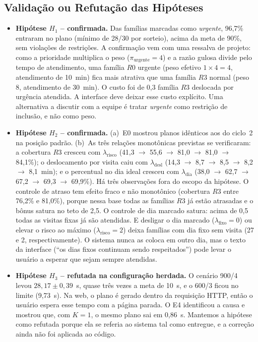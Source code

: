 \documentclass[11pt,a4paper]{article}
\begin{document}
\subsection{Validação ou Refutação das Hipóteses}
\begin{itemize}
    \item \textbf{Hipótese $H_1$ -- confirmada.} Das famílias marcadas como \emph{urgente}, 96,7\% entraram no plano (mínimo de 28/30 por sorteio), acima da meta de 90\%, sem violações de restrições. A confirmação vem com uma ressalva de projeto: como a prioridade multiplica o peso ($\pi_{\text{urgente}}=4$) e a razão gulosa divide pelo tempo de atendimento, uma família $R0$ urgente (peso efetivo $1 \times 4 = 4$, atendimento de 10~min) fica mais atrativa que uma família $R3$ normal (peso 8, atendimento de 30~min). O custo foi de 0,3 família $R3$ deslocada por urgência atendida. A interface deve deixar esse custo explícito. Uma alternativa a discutir com a equipe é tratar \emph{urgente} como restrição de inclusão, e não como peso.
    \item \textbf{Hipótese $H_2$ -- confirmada.} (a)~E0 mostrou planos idênticos aos do ciclo~2 na posição padrão. (b)~As três relações monotônicas previstas se verificaram: a cobertura $R3$ cresceu com $\lambda_{\text{risco}}$ (41,3 $\to$ 55,6 $\to$ 81,0 $\to$ 81,0 $\to$ 84,1\%); o deslocamento por visita caiu com $\lambda_{\text{desl}}$ (14,3 $\to$ 8,7 $\to$ 8,5 $\to$ 8,2 $\to$ 8,1~min); e o percentual no dia ideal cresceu com $\lambda_{\text{dia}}$ (38,0 $\to$ 62,7 $\to$ 67,2 $\to$ 69,3 $\to$ 69,9\%). Há três observações fora do escopo da hipótese. O controle de atraso tem efeito fraco e não monotônico (cobertura $R3$ entre 76,2\% e 81,0\%), porque nessa base todas as famílias $R3$ já estão atrasadas e o bônus satura no teto de 2,5. O controle de dia marcado satura: acima de 0,5 todas as visitas fixas já são atendidas. E desligar o dia marcado ($\lambda_{\text{fixo}}=0$) ou elevar o risco ao máximo ($\lambda_{\text{risco}}=2$) deixa famílias com dia fixo sem visita (27 e 2, respectivamente). O sistema nunca as coloca em outro dia, mas o texto da interface (``os dias fixos continuam sendo respeitados'') pode levar o usuário a esperar que sejam sempre atendidas.
    \item \textbf{Hipótese $H_3$ -- refutada na configuração herdada.} O cenário 900/4 levou $28{,}17 \pm 0{,}39$~s, quase três vezes a meta de 10~s, e o 600/3 ficou no limite (9,73~s). Na web, o plano é gerado dentro da requisição HTTP, então o usuário espera esse tempo com a página parada. O E4 identificou a causa e mostrou que, com $K=1$, o mesmo plano sai em 0,86~s. Mantemos a hipótese como refutada porque ela se referia ao sistema tal como entregue, e a correção ainda não foi aplicada ao código.

\end{itemize}
\end{document}
